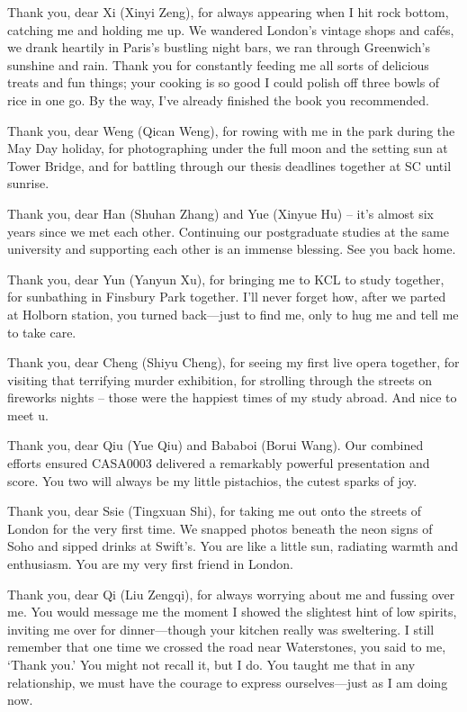 \documentclass[
  12pt,
  oneside]{book}
\begin{document}
Thank you, dear Xi (Xinyi Zeng), for always appearing when I hit rock bottom, catching me and holding me up. We wandered London's vintage shops and cafés, we drank heartily in Paris's bustling night bars, we ran through Greenwich's sunshine and rain. Thank you for constantly feeding me all sorts of delicious treats and fun things; your cooking is so good I could polish off three bowls of rice in one go. By the way, I've already finished the book you recommended.

Thank you, dear Weng (Qican Weng), for rowing with me in the park during the May Day holiday, for photographing under the full moon and the setting sun at Tower Bridge, and for battling through our thesis deadlines together at SC until sunrise.

Thank you, dear Han (Shuhan Zhang) and Yue (Xinyue Hu) -- it's almost six years since we met each other. Continuing our postgraduate studies at the same university and supporting each other is an immense blessing. See you back home.

Thank you, dear Yun (Yanyun Xu), for bringing me to KCL to study together, for sunbathing in Finsbury Park together. I'll never forget how, after we parted at Holborn station, you turned back---just to find me, only to hug me and tell me to take care.

Thank you, dear Cheng (Shiyu Cheng), for seeing my first live opera together, for visiting that terrifying murder exhibition, for strolling through the streets on fireworks nights -- those were the happiest times of my study abroad. And nice to meet u.

Thank you, dear Qiu (Yue Qiu) and Bababoi (Borui Wang). Our combined efforts ensured CASA0003 delivered a remarkably powerful presentation and score. You two will always be my little pistachios, the cutest sparks of joy.

Thank you, dear Ssie (Tingxuan Shi), for taking me out onto the streets of London for the very first time. We snapped photos beneath the neon signs of Soho and sipped drinks at Swift's. You are like a little sun, radiating warmth and enthusiasm. You are my very first friend in London.

Thank you, dear Qi (Liu Zengqi), for always worrying about me and fussing over me. You would message me the moment I showed the slightest hint of low spirits, inviting me over for dinner---though your kitchen really was sweltering. I still remember that one time we crossed the road near Waterstones, you said to me, `Thank you.' You might not recall it, but I do. You taught me that in any relationship, we must have the courage to express ourselves---just as I am doing now.
\end{document}
